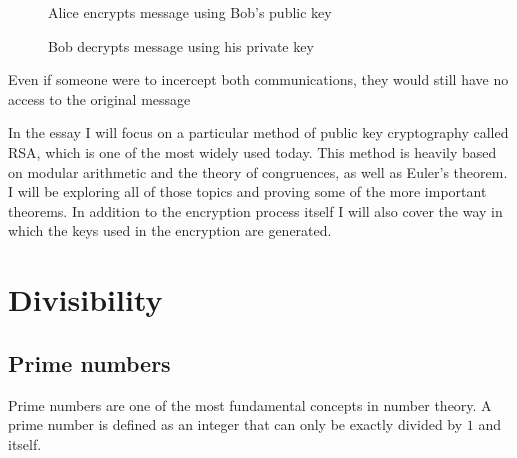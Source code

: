 \documentclass[12pt, titlepage]{article}
\begin{document}
    \begin{figure}[h!] 
    \centering
        
        \vspace{1cm}
        Alice encrypts message using Bob's public key
        \vspace{1cm}


        \vspace{1cm}
        Bob decrypts message using his private key
        \vspace{1cm}
    \end{figure}

    Even if someone were to incercept both communications, they would still have no access
    to the original message

    In the essay I will focus on a particular method of public key cryptography called RSA,
    which is one of the most widely used today. This method is heavily based on modular
    arithmetic and the theory of congruences, as well as Euler's theorem. I will be
    exploring all of those topics and proving some of the more important theorems. In
    addition to the encryption process itself I will also cover the way in which the keys
    used in the encryption are generated.


\section{Divisibility}
    \subsection{Prime numbers}
    Prime numbers are one of the most fundamental concepts in number theory. A prime number
    is defined as an integer that can only be exactly divided by $1$ and itself.
\end{document}
